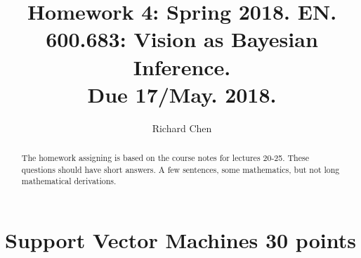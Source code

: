 \documentclass[10pt,onecolumn,letterpaper]{article}
\begin{document}
\title{Homework 4: Spring 2018. EN. 600.683: Vision as Bayesian Inference.\\  Due 17/May. 2018.}

\author{Richard Chen}


\maketitle
\thispagestyle{empty}

\begin{abstract}
The homework assigning is based on the course notes for lectures 20-25.
These  questions should have short answers. A few sentences, some mathematics, but not long mathematical derivations.
\end{abstract}


\section*{Support Vector Machines 30 points}
\end{document}

